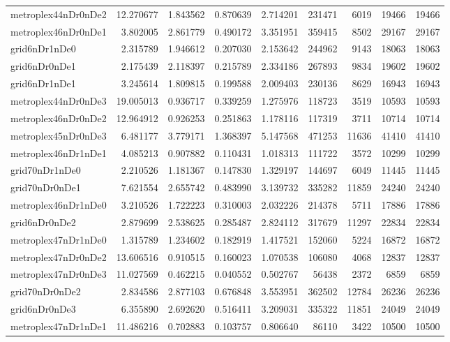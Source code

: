 \documentclass[../../../thesis.tex]{subfiles}
\begin{document}
\begin{longtable}{|l|r|r|r|r|r|r|r|r|}
metroplex44nDr0nDe2 & 12.270677 & 1.843562 & 0.870639 & 2.714201 & 231471 & 6019 & 19466 & 19466 \\
metroplex46nDr0nDe1 & 3.802005 & 2.861779 & 0.490172 & 3.351951 & 359415 & 8502 & 29167 & 29167 \\
grid6nDr1nDe0 & 2.315789 & 1.946612 & 0.207030 & 2.153642 & 244962 & 9143 & 18063 & 18063 \\
grid6nDr0nDe1 & 2.175439 & 2.118397 & 0.215789 & 2.334186 & 267893 & 9834 & 19602 & 19602 \\
grid6nDr1nDe1 & 3.245614 & 1.809815 & 0.199588 & 2.009403 & 230136 & 8629 & 16943 & 16943 \\
metroplex44nDr0nDe3 & 19.005013 & 0.936717 & 0.339259 & 1.275976 & 118723 & 3519 & 10593 & 10593 \\
metroplex46nDr0nDe2 & 12.964912 & 0.926253 & 0.251863 & 1.178116 & 117319 & 3711 & 10714 & 10714 \\
metroplex45nDr0nDe3 & 6.481177 & 3.779171 & 1.368397 & 5.147568 & 471253 & 11636 & 41410 & 41410 \\
metroplex46nDr1nDe1 & 4.085213 & 0.907882 & 0.110431 & 1.018313 & 111722 & 3572 & 10299 & 10299 \\
grid70nDr1nDe0 & 2.210526 & 1.181367 & 0.147830 & 1.329197 & 144697 & 6049 & 11445 & 11445 \\
grid70nDr0nDe1 & 7.621554 & 2.655742 & 0.483990 & 3.139732 & 335282 & 11859 & 24240 & 24240 \\
metroplex46nDr1nDe0 & 3.210526 & 1.722223 & 0.310003 & 2.032226 & 214378 & 5711 & 17886 & 17886 \\
grid6nDr0nDe2 & 2.879699 & 2.538625 & 0.285487 & 2.824112 & 317679 & 11297 & 22834 & 22834 \\
metroplex47nDr1nDe0 & 1.315789 & 1.234602 & 0.182919 & 1.417521 & 152060 & 5224 & 16872 & 16872 \\
metroplex47nDr0nDe2 & 13.606516 & 0.910515 & 0.160023 & 1.070538 & 106080 & 4068 & 12837 & 12837 \\
metroplex47nDr0nDe3 & 11.027569 & 0.462215 & 0.040552 & 0.502767 & 56438 & 2372 & 6859 & 6859 \\
grid70nDr0nDe2 & 2.834586 & 2.877103 & 0.676848 & 3.553951 & 362502 & 12784 & 26236 & 26236 \\
grid6nDr0nDe3 & 6.355890 & 2.692620 & 0.516411 & 3.209031 & 335322 & 11851 & 24049 & 24049 \\
metroplex47nDr1nDe1 & 11.486216 & 0.702883 & 0.103757 & 0.806640 & 86110 & 3422 & 10500 & 10500 \\

\end{longtable}
\end{document}

